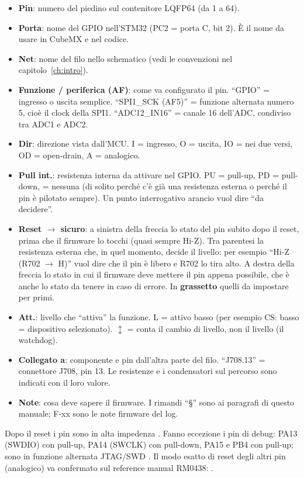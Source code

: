 \begin{itemize}
\item \textbf{Pin}: numero del piedino sul contenitore LQFP64 (da 1 a 64).
\item \textbf{Porta}: nome del GPIO nell'STM32 (PC2 = porta C, bit 2). È il nome da usare in CubeMX e nel codice.
\item \textbf{Net}: nome del filo nello schematico (vedi le convenzioni nel capitolo~\ref{ch:intro}).
\item \textbf{Funzione / periferica (AF)}: come va configurato il pin. \enquote{GPIO} = ingresso o uscita semplice. \enquote{SPI1\_SCK (AF5)} = funzione alternata numero 5, cioè il clock della SPI1. \enquote{ADC12\_IN16} = canale 16 dell'ADC, condiviso tra ADC1 e ADC2.
\item \textbf{Dir}: direzione vista dall'MCU. I = ingresso, O = uscita, IO = nei due versi, OD = open-drain, A = analogico.
\item \textbf{Pull int.}: resistenza interna da attivare nel GPIO. PU = pull-up, PD = pull-down, \textendash{} = nessuna (di solito perché c'è già una resistenza esterna o perché il pin è pilotato sempre). Un punto interrogativo arancio vuol dire \enquote{da decidere}.
\item \textbf{Reset $\to$ sicuro}: a sinistra della freccia lo stato del pin subito dopo il reset, prima che il firmware lo tocchi (quasi sempre Hi-Z). Tra parentesi la resistenza esterna che, in quel momento, decide il livello: per esempio \enquote{Hi-Z (R702 $\to$ H)} vuol dire che il pin è libero e R702 lo tira alto. A destra della freccia lo stato in cui il firmware deve mettere il pin appena possibile, che è anche lo stato da tenere in caso di errore. In \textbf{grassetto} quelli da impostare per primi.
\item \textbf{Att.}: livello che \enquote{attiva} la funzione. L = attivo basso (per esempio CS: basso = dispositivo selezionato). \(\updownarrow\) = conta il cambio di livello, non il livello (il watchdog).
\item \textbf{Collegato a}: componente e pin dall'altra parte del filo. \enquote{J708.13} = connettore J708, pin 13. Le resistenze e i condensatori sul percorso sono indicati con il loro valore.
\item \textbf{Note}: cosa deve sapere il firmware. I rimandi \enquote{§} sono ai paragrafi di questo manuale; F-xx sono le note firmware del log.
\end{itemize}

\begin{nota}
Dopo il reset i pin sono in alta impedenza . Fanno eccezione i pin di debug: PA13 (SWDIO) con pull-up, PA14 (SWCLK) con pull-down, PA15 e PB4 con pull-up; sono in funzione alternata JTAG/SWD . Il modo esatto di reset degli altri pin (analogico) va confermato sul reference manual RM0438: \DV.
\end{nota}

